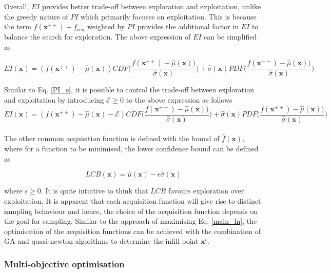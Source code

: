 Overall, $EI$ provides better trade-off between exploration and exploitation, unlike the greedy nature of $PI$ which primarily focuses on exploitation. This is because the term $f(\bm x^{++}) - f_{cen}$ weighted by $PI$ provides the additional factor in $EI$ to balance the search for exploration. The above expression of $EI$ can be simplified as
 
\begin{equation}
EI(\bm x)=(f(\bm{x}^{++}) - \hat\mu(\bm x)) CDF\bigg( \frac{f(\bm{x}^{++}) - \hat\mu(\bm x))}{\hat\sigma(\bm x)} \bigg)+\hat\sigma(\bm x) PDF \bigg( \frac{f(\bm{x}^{++}) - \hat\mu(\bm x))}{\hat\sigma(\bm x)} \bigg)
\end{equation}
 
 Similar to Eq. \eqref{PI_e}, it is possible to control the trade-off between exploration and exploitation by introducing $\mathscr{E}\geq 0$ to the above expression as follows \\

\begin{equation}
EI(\bm x)=(f(\bm{x}^{++}) - \hat\mu(\bm x) -  \mathscr{E}) CDF\bigg( \frac{f(\bm{x}^{++}) - \hat\mu(\bm x))}{\hat\sigma(\bm x)} \bigg)+\hat\sigma(\bm x) PDF \bigg( \frac{f(\bm{x}^{++}) - \hat\mu(\bm x))}{\hat\sigma(\bm x)} \bigg)
\end{equation}\\

The other common acquisition function is defined with the bound of  $\hat{f}(\bm x)$, where for a function to be minimised, the  lower confidence bound can be defined as

\begin{equation}\label{lcb}
LCB(\bm x) = \hat{\mu}(\bm x) - \epsilon \hat\sigma(\bm x)
\end{equation}

 where $\epsilon \geq 0$. It is quite intuitive to think that $LCB$ favours exploration over exploitation. It is apparent that each acquisition function will give rise to distinct sampling behaviour and hence, the choice of the acquisition function depends on the goal for sampling. Similar to the approach of maximising Eq. \eqref{main_ln}, the optimisation of the acquisition functions can be achieved with the combination of GA and quasi-newton algorithms to determine the infill point $\bm x^{\iota}$.  
 
\subsubsection{Multi-objective optimisation}

